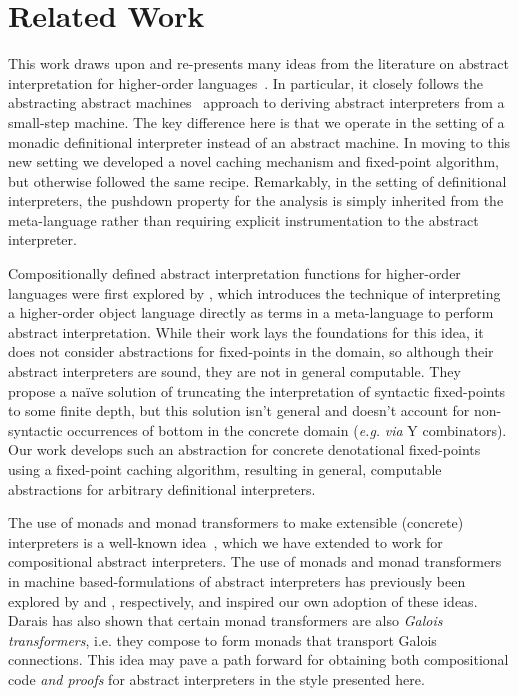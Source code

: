 \section{Related Work}\label{s:related-work}

This work draws upon and re-presents many ideas from the literature on
abstract interpretation for higher-order
languages~\cite{dvanhorn:Midtgaard2012Controlflow}.  In particular, it
closely follows the abstracting abstract
machines~\cite{dvanhorn:VanHorn2010Abstracting,dvanhorn:VanHorn2012Systematic}
approach to deriving abstract interpreters from a small-step
machine. The key difference here is that we operate in the setting of
a monadic definitional interpreter instead of an abstract machine. In
moving to this new setting we developed a novel caching mechanism and
fixed-point algorithm, but otherwise followed the same
recipe. Remarkably, in the setting of definitional interpreters, the
pushdown property for the analysis is simply inherited from the
meta-language rather than requiring explicit instrumentation to the
abstract interpreter.

Compositionally defined abstract interpretation functions for
higher-order languages were first explored by
\citet{local:jones-book1995}, which introduces the technique of
interpreting a higher-order object language directly as terms in a
meta-language to perform abstract interpretation. While their work
lays the foundations for this idea, it does not consider abstractions
for fixed-points in the domain, so although their abstract interpreters
are sound, they are not in general computable. They propose a naïve
solution of truncating the interpretation of syntactic fixed-points to
some finite depth, but this solution isn't general and doesn't account
for non-syntactic occurrences of bottom in the concrete domain (\emph{e.g.}
\emph{via} Y combinators). Our work develops such an abstraction for concrete
denotational fixed-points using a fixed-point caching algorithm, resulting in
general, computable abstractions for arbitrary definitional interpreters.

The use of monads and monad transformers to make extensible (concrete)
interpreters is a well-known
idea~\cite{davdar:Moggi:1989:Monads,local:steele-popl94,dvanhorn:Liang1995Monad},
which we have extended to work for compositional abstract
interpreters.  The use of monads and monad transformers in machine
based-formulations of abstract interpreters has previously been
explored by \citet{dvanhorn:Sergey2013Monadic} and
\citet{local:darais-oopsla2015}, respectively, and inspired our own
adoption of these ideas.  Darais has also shown that certain monad
transformers are also \emph{Galois transformers}, i.e. they compose to
form monads that transport Galois connections.  This idea may pave a
path forward for obtaining both compositional code \emph{and proofs}
for abstract interpreters in the style presented here.

